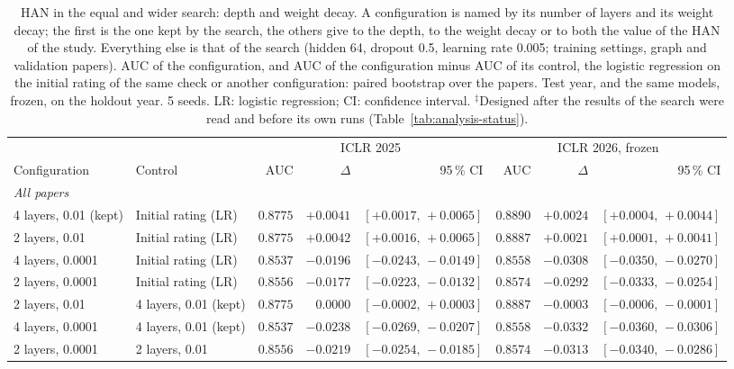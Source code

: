 \begin{table}[t]
\centering
\footnotesize
\setlength{\tabcolsep}{1.5pt}
\caption{HAN in the equal and wider search: depth and weight decay. A configuration is named by its number of layers and its weight decay; the first is the one kept by the search, the others give to the depth, to the weight decay or to both the value of the HAN of the study. Everything else is that of the search (hidden 64, dropout 0.5, learning rate 0.005; training settings, graph and validation papers). AUC of the configuration, and AUC of the configuration minus AUC of its control, the logistic regression on the initial rating of the same check or another configuration: paired bootstrap over the papers. Test year, and the same models, frozen, on the holdout year. 5 seeds. LR: logistic regression; CI: confidence interval. $^{\ddagger}$Designed after the results of the search were read and before its own runs (Table~\ref{tab:analysis-status}).}
\label{tab:depth}
\begin{tabular}{@{}llrrrrrr@{}}
\toprule
 & & \multicolumn{3}{c}{ICLR 2025} & \multicolumn{3}{c}{ICLR 2026, frozen} \\
\cmidrule(lr){3-5} \cmidrule(lr){6-8}
Configuration & Control & AUC & $\Delta$ & 95\,\% CI & AUC & $\Delta$ & 95\,\% CI \\
\midrule
\multicolumn{8}{l}{\emph{All papers}} \\
4 layers, 0.01 (kept) & Initial rating (LR) & $0.8775$ & $+0.0041$ & $[+0.0017,\,+0.0065]$ & $0.8890$ & $+0.0024$ & $[+0.0004,\,+0.0044]$ \\
2 layers, 0.01 & Initial rating (LR) & $0.8775$ & $+0.0042$ & $[+0.0016,\,+0.0065]$ & $0.8887$ & $+0.0021$ & $[+0.0001,\,+0.0041]$ \\
4 layers, 0.0001 & Initial rating (LR) & $0.8537$ & $-0.0196$ & $[-0.0243,\,-0.0149]$ & $0.8558$ & $-0.0308$ & $[-0.0350,\,-0.0270]$ \\
2 layers, 0.0001 & Initial rating (LR) & $0.8556$ & $-0.0177$ & $[-0.0223,\,-0.0132]$ & $0.8574$ & $-0.0292$ & $[-0.0333,\,-0.0254]$ \\
2 layers, 0.01 & 4 layers, 0.01 (kept) & $0.8775$ & $0.0000$ & $[-0.0002,\,+0.0003]$ & $0.8887$ & $-0.0003$ & $[-0.0006,\,-0.0001]$ \\
4 layers, 0.0001 & 4 layers, 0.01 (kept) & $0.8537$ & $-0.0238$ & $[-0.0269,\,-0.0207]$ & $0.8558$ & $-0.0332$ & $[-0.0360,\,-0.0306]$ \\
2 layers, 0.0001 & 2 layers, 0.01 & $0.8556$ & $-0.0219$ & $[-0.0254,\,-0.0185]$ & $0.8574$ & $-0.0313$ & $[-0.0340,\,-0.0286]$ \\

\end{tabular}
\end{table}
